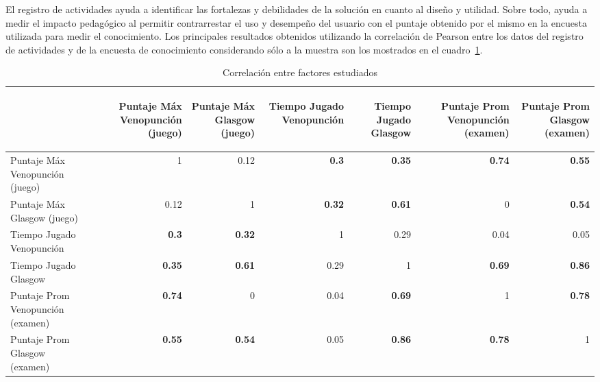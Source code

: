 El registro de actividades ayuda a identificar las  fortalezas y debilidades de
la solución en cuanto al diseño y utilidad. Sobre todo, ayuda a medir el impacto
pedagógico al permitir contrarrestar el uso y desempeño del usuario con el
puntaje obtenido por el mismo en la encuesta utilizada para medir el
conocimiento. Los principales resultados obtenidos utilizando la correlación de 
Pearson\cite{BoslaughStatistics2008} entre los datos del registro de actividades y 
de la encuesta de conocimiento considerando sólo a la muestra son los mostrados en el 
cuadro~\ref{tab:all_correlation}.

\begin{table}
\centering
\caption{Correlación entre factores estudiados} 
\begin{tabular}{lrrrrrr}
\toprule
        &
\begin{sideways}\textbf{Puntaje Máx Venopunción (juego)}\end{sideways}  &
\begin{sideways}\textbf{Puntaje Máx Glasgow (juego)}\end{sideways}        &
\begin{sideways}\textbf{Tiempo Jugado Venopunción}\end{sideways}         &
\begin{sideways}\textbf{Tiempo Jugado Glasgow}\end{sideways} &
\begin{sideways}\textbf{Puntaje Prom Venopunción (examen)}\end{sideways}  &
\begin{sideways}\textbf{Puntaje Prom Glasgow (examen)}\end{sideways}    \\
\midrule
Puntaje Máx Venopunción (juego)    & 1    & 0.12  & \textbf{0.3}   & \textbf{0.35} & \textbf{0.74} & \textbf{0.55} \\
Puntaje Máx Glasgow (juego)       & 0.12 & 1     & \textbf{0.32} & \textbf{0.61} & 0 & \textbf{0.54}\\
Tiempo Jugado Venopunción     		 & \textbf{0.3}  & \textbf{0.32} & 1  & 0.29 & 0.04 & 0.05\\
Tiempo Jugado Glasgow 				 & \textbf{0.35} & \textbf{0.61}  & 0.29  & 1    & \textbf{0.69} & \textbf{0.86}\\
Puntaje Prom Venopunción (examen) & \textbf{0.74} & 0 	& 0.04  & \textbf{0.69} & 1 & \textbf{0.78} \\
Puntaje Prom Glasgow (examen)    		 & \textbf{0.55} & \textbf{0.54} & 0.05  & \textbf{0.86} & \textbf{0.78} & 1 \\
\bottomrule               
\end{tabular}

\label{tab:all_correlation}
\end{table}

